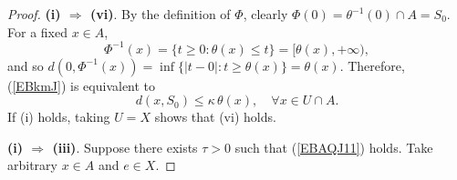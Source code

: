 \documentclass[10pt,a4paper]{amsart}
\begin{document}
\begin{proof}
	
	\noindent\textbf{(i) $\Rightarrow$ (vi)}.
	By the definition of $\Phi$, clearly $\Phi(0)=\theta^{-1}(0)\cap A= S_0$.
	For a fixed $x\in A$,
	\[
	\Phi^{-1}(x)=\{t\ge0:\theta(x)\le t\}=[\theta(x),+\infty),
	\]
	and	so $d(0,\Phi^{-1}(x))=\inf\{|t-0|:t\ge\theta(x)\}=\theta(x)$.
	Therefore,      (\ref{EBkmJ})    is equivalent to
	\begin{equation}\label{EViiiD}
		d(x, S_0)\le\kappa\,\theta(x),\quad\forall x\in U\cap A.
	\end{equation}
	If (i) holds, taking $U=X$ shows that (vi) holds.
	
	
	
	
	
	
	
	
	
	
	\noindent\textbf{(i) $\Rightarrow$ (iii)}.
	Suppose there exists \(\tau > 0\)  such that   (\ref{EBAQJ11}) holds. Take arbitrary \(x \in A\) and \(e \in X\).
	

\end{proof}
\end{document}
